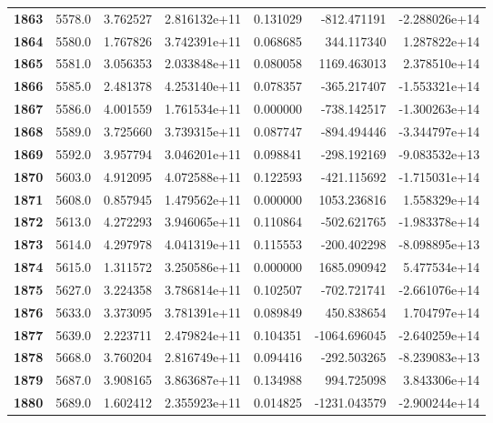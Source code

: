 \documentclass{report}[12pt]
\begin{document}
\begin{center}
\begin{tabular}{lrrrrrr}
\textbf{1863} &         5578.0 &   3.762527 &  2.816132e+11 &    0.131029 &  -812.471191 & -2.288026e+14 \\
\textbf{1864} &         5580.0 &   1.767826 &  3.742391e+11 &    0.068685 &   344.117340 &  1.287822e+14 \\
\textbf{1865} &         5581.0 &   3.056353 &  2.033848e+11 &    0.080058 &  1169.463013 &  2.378510e+14 \\
\textbf{1866} &         5585.0 &   2.481378 &  4.253140e+11 &    0.078357 &  -365.217407 & -1.553321e+14 \\
\textbf{1867} &         5586.0 &   4.001559 &  1.761534e+11 &    0.000000 &  -738.142517 & -1.300263e+14 \\
\textbf{1868} &         5589.0 &   3.725660 &  3.739315e+11 &    0.087747 &  -894.494446 & -3.344797e+14 \\
\textbf{1869} &         5592.0 &   3.957794 &  3.046201e+11 &    0.098841 &  -298.192169 & -9.083532e+13 \\
\textbf{1870} &         5603.0 &   4.912095 &  4.072588e+11 &    0.122593 &  -421.115692 & -1.715031e+14 \\
\textbf{1871} &         5608.0 &   0.857945 &  1.479562e+11 &    0.000000 &  1053.236816 &  1.558329e+14 \\
\textbf{1872} &         5613.0 &   4.272293 &  3.946065e+11 &    0.110864 &  -502.621765 & -1.983378e+14 \\
\textbf{1873} &         5614.0 &   4.297978 &  4.041319e+11 &    0.115553 &  -200.402298 & -8.098895e+13 \\
\textbf{1874} &         5615.0 &   1.311572 &  3.250586e+11 &    0.000000 &  1685.090942 &  5.477534e+14 \\
\textbf{1875} &         5627.0 &   3.224358 &  3.786814e+11 &    0.102507 &  -702.721741 & -2.661076e+14 \\
\textbf{1876} &         5633.0 &   3.373095 &  3.781391e+11 &    0.089849 &   450.838654 &  1.704797e+14 \\
\textbf{1877} &         5639.0 &   2.223711 &  2.479824e+11 &    0.104351 & -1064.696045 & -2.640259e+14 \\
\textbf{1878} &         5668.0 &   3.760204 &  2.816749e+11 &    0.094416 &  -292.503265 & -8.239083e+13 \\
\textbf{1879} &         5687.0 &   3.908165 &  3.863687e+11 &    0.134988 &   994.725098 &  3.843306e+14 \\
\textbf{1880} &         5689.0 &   1.602412 &  2.355923e+11 &    0.014825 & -1231.043579 & -2.900244e+14 \\

\end{tabular}
\end{center}
\end{document}
